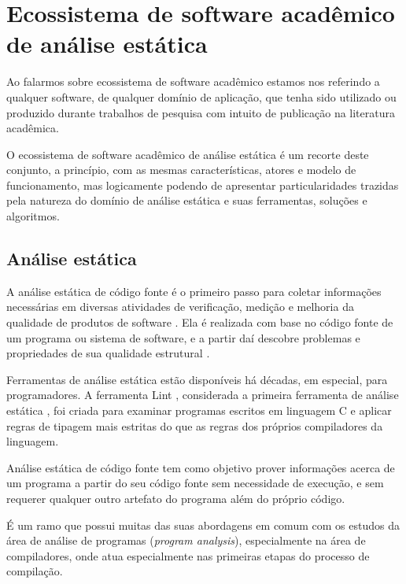 \section{Ecossistema de software acadêmico de análise estática} \label{analise-estatica}

Ao falarmos sobre ecossistema de software acadêmico estamos nos referindo a
qualquer software, de qualquer domínio de aplicação, que tenha sido utilizado
ou produzido durante trabalhos de pesquisa com intuito de publicação na
literatura acadêmica.

O ecossistema de software acadêmico de análise estática é um recorte deste
conjunto, a princípio, com as mesmas características, atores e modelo de
funcionamento, mas logicamente podendo de apresentar particularidades trazidas
pela natureza do domínio de análise estática e suas ferramentas, soluções e
algoritmos.

\subsection{Análise estática}

A análise estática de código fonte é o primeiro passo para coletar informações
necessárias em diversas atividades de verificação, medição e melhoria da
qualidade de produtos de software \cite{cruz2009code, kirkov2010source}. Ela é
realizada com base no código fonte de um programa ou sistema de software, e a
partir daí descobre problemas e propriedades de sua qualidade estrutural
\cite{chess2007secure}.

Ferramentas de análise estática estão disponíveis há décadas, em especial,
para programadores. A ferramenta Lint \cite{johnson1978lint}, considerada a
primeira ferramenta de análise estática \cite{gosain2015static}, foi criada para
examinar programas escritos em linguagem C e aplicar regras de tipagem mais
estritas do que as regras dos próprios compiladores da linguagem.

Análise estática de código fonte tem como objetivo prover
informações acerca de um programa a partir do seu código fonte sem
necessidade de execução, e sem requerer qualquer outro artefato do programa
além do próprio código.

É um ramo que possui muitas das suas abordagens em comum com os estudos da
área de análise de programas ({\it program analysis}), especialmente na área de
compiladores, onde atua especialmente nas primeiras etapas do processo de compilação.

